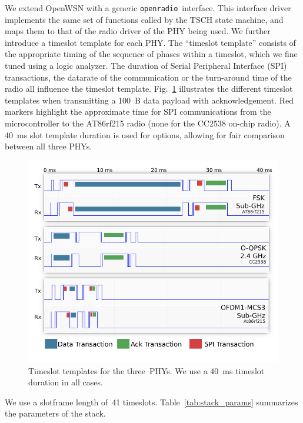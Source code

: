 \documentclass[sensors,article,submit,moreauthors,pdftex]{Definitions/mdpi}
\newcommand{\openradio}     {\texttt{openradio}}
\newcommand{\figwidth}      {0.78}
\begin{document}

We extend OpenWSN with a generic \openradio\ interface.
This interface driver implements the same set of functions called by the TSCH state machine, and maps them to that of the radio driver of the PHY being used.
We further introduce a timeslot template for each PHY.
The ``timeslot template'' consists of the appropriate timing of the sequence of phases within a timeslot, which we fine tuned using a logic analyzer.
The duration of Serial Peripheral Interface (SPI) transactions, the datarate of the communication or the turn-around time of the radio all influence the timeslot template.
Fig.~\ref{fig:timeslot_templates} illustrates the different timeslot templates when transmitting a 100~B data payload with acknowledgement.
Red markers highlight the approximate time for SPI communications from the microcontroller to the AT86rf215 radio (none for the CC2538 on-chip radio).
A 40~ms slot template duration is used for options, allowing for fair comparison between all three PHYs.

\begin{figure}
	\centering
	\includegraphics[width=\figwidth\columnwidth]{timeslot_templates}
	\caption{
	    Timeslot templates for the three~PHYs.
	    We use a 40~ms timeslot duration in all cases.
	}
    \label{fig:timeslot_templates}
\end{figure}


We use a slotframe length of~41 timeslots.
Table~\ref{tab:stack_params} summarizes the parameters of the stack.
\end{document}
